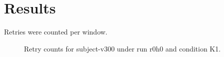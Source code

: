 \section{Results}
Retries were counted per window.
\begin{figure}
\caption{Retry counts for subject-v300 under run r0h0 and condition K1.}
\end{figure}
